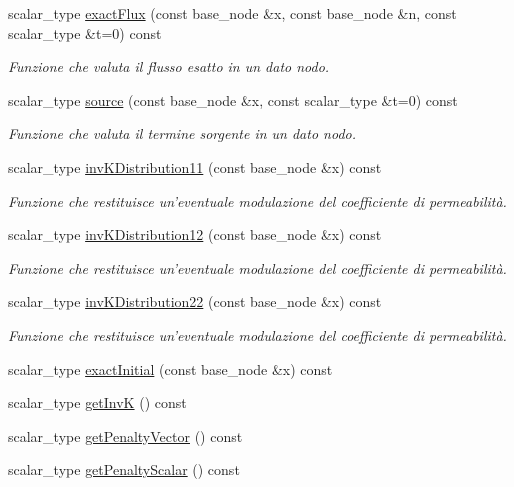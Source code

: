 \begin{DoxyCompactItemize}
scalar\-\_\-type \hyperlink{classMediumData_a6f3d3b64009602eb22a7c54b74a33a34}{exact\-Flux} (const base\-\_\-node \&x, const base\-\_\-node \&n, const scalar\-\_\-type \&t=0) const 
\begin{DoxyCompactList}\small\item\em Funzione che valuta il flusso esatto in un dato nodo. \end{DoxyCompactList}\item 
scalar\-\_\-type \hyperlink{classMediumData_a1f5a2647becdcd8db8ad4c1a9b79b29e}{source} (const base\-\_\-node \&x, const scalar\-\_\-type \&t=0) const 
\begin{DoxyCompactList}\small\item\em Funzione che valuta il termine sorgente in un dato nodo. \end{DoxyCompactList}\item 
scalar\-\_\-type \hyperlink{classMediumData_aae75c00abbad84594130890eb34dafd9}{inv\-K\-Distribution11} (const base\-\_\-node \&x) const 
\begin{DoxyCompactList}\small\item\em Funzione che restituisce un'eventuale modulazione del coefficiente di permeabilità. \end{DoxyCompactList}\item 
scalar\-\_\-type \hyperlink{classMediumData_aef29ca88f4183c72f590abffcff1fc87}{inv\-K\-Distribution12} (const base\-\_\-node \&x) const 
\begin{DoxyCompactList}\small\item\em Funzione che restituisce un'eventuale modulazione del coefficiente di permeabilità. \end{DoxyCompactList}\item 
scalar\-\_\-type \hyperlink{classMediumData_a5298eacbba56d9f3d6bc6b2297cdac31}{inv\-K\-Distribution22} (const base\-\_\-node \&x) const 
\begin{DoxyCompactList}\small\item\em Funzione che restituisce un'eventuale modulazione del coefficiente di permeabilità. \end{DoxyCompactList}\item 
scalar\-\_\-type \hyperlink{classMediumData_a80235292e1223f4b68a37832f7be9828}{exact\-Initial} (const base\-\_\-node \&x) const 
\item 
scalar\-\_\-type \hyperlink{classMediumData_a72374c5da3834b4313280f5ae53406fb}{get\-Inv\-K} () const 
\item 
scalar\-\_\-type \hyperlink{classMediumData_ac1646aa22f5ed8ea92a14560dfc0905f}{get\-Penalty\-Vector} () const 
\item 
scalar\-\_\-type \hyperlink{classMediumData_a627f26f5f80bb4139a548e2d2cce1a47}{get\-Penalty\-Scalar} () const 
\end{DoxyCompactItemize}


